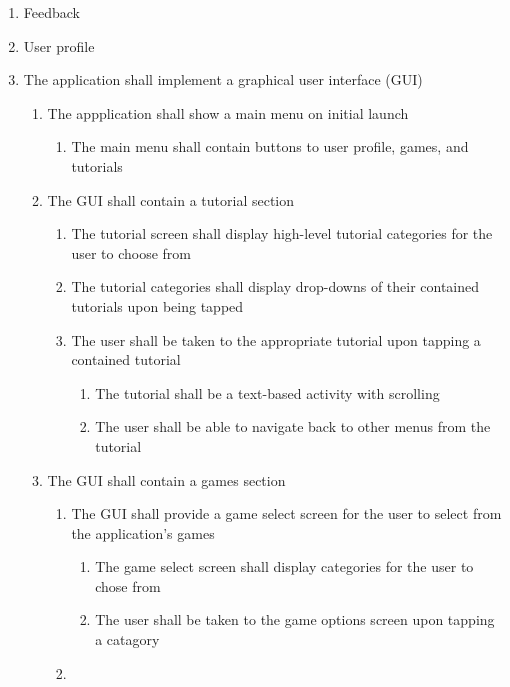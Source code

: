 \documentclass[12pt,letterpaper,oneside]{article}
\begin{document}
\begin{enumerate}
	\item
		Feedback

	\item
		User profile

	\item	%
		The application shall implement a graphical user interface (GUI)
		\begin{enumerate}
			\item	%
				The appplication shall show a main menu on initial launch
				\begin{enumerate}
					\item
						The main menu shall contain buttons to user profile, games, and tutorials
				\end{enumerate}
			\item	%
				The GUI shall contain a tutorial section
				\begin{enumerate}
					\item	%
						The tutorial screen shall display high-level tutorial categories for the user to choose from
					\item	%
						The tutorial categories shall display drop-downs of their contained tutorials upon being tapped
					\item	%
						The user shall be taken to the appropriate tutorial upon tapping a contained tutorial
						\begin{enumerate}
							\item
								The tutorial shall be a text-based activity with scrolling
							\item
								The user shall be able to navigate back to other menus from the tutorial
						\end{enumerate}
				\end{enumerate}
			\item
				The GUI shall contain a games section
				\begin{enumerate}
					\item
						The GUI shall provide a game select screen for the user to select from the application's games
						\begin{enumerate}
							\item
								The game select screen shall display categories for the user to chose from
							\item
								The user shall be taken to the game options screen upon tapping a catagory
						\end{enumerate}
					\item

\end{enumerate}
\end{enumerate}
\end{enumerate}
\end{document}
